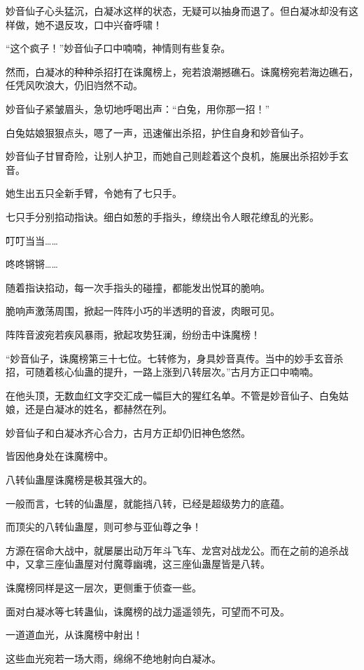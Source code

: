 \begin{this_body}
妙音仙子心头猛沉，白凝冰这样的状态，无疑可以抽身而退了。但白凝冰却没有这样做，她不退反攻，口中兴奋呼啸！

“这个疯子！”妙音仙子口中喃喃，神情则有些复杂。

然而，白凝冰的种种杀招打在诛魔榜上，宛若浪潮撼礁石。诛魔榜宛若海边礁石，任凭风吹浪大，仍旧岿然不动。

妙音仙子紧皱眉头，急切地呼喝出声：“白兔，用你那一招！”

白兔姑娘狠狠点头，嗯了一声，迅速催出杀招，护住自身和妙音仙子。

妙音仙子甘冒奇险，让别人护卫，而她自己则趁着这个良机，施展出杀招妙手玄音。

她生出五只全新手臂，令她有了七只手。

七只手分别掐动指诀。细白如葱的手指头，缭绕出令人眼花缭乱的光影。

叮叮当当……

咚咚锵锵……

随着指诀掐动，每一次手指头的碰撞，都能发出悦耳的脆响。

脆响声激荡周围，掀起一阵阵小巧的半透明的音波，肉眼可见。

阵阵音波宛若疾风暴雨，掀起攻势狂澜，纷纷击中诛魔榜！

“妙音仙子，诛魔榜第三十七位。七转修为，身具妙音真传。当中的妙手玄音杀招，可随着核心仙蛊的提升，一路上涨到八转层次。”古月方正口中喃喃。

在他头顶，无数血红文字交汇成一幅巨大的猩红名单。不管是妙音仙子、白兔姑娘，还是白凝冰的姓名，都赫然在列。

妙音仙子和白凝冰齐心合力，古月方正却仍旧神色悠然。

皆因他身处在诛魔榜中。

八转仙蛊屋诛魔榜是极其强大的。

一般而言，七转的仙蛊屋，就能挡八转，已经是超级势力的底蕴。

而顶尖的八转仙蛊屋，则可参与亚仙尊之争！

方源在宿命大战中，就屡屡出动万年斗飞车、龙宫对战龙公。而在之前的追杀战中，又拿三座仙蛊屋对付魔尊幽魂，这三座仙蛊屋皆是八转。

诛魔榜同样是这一层次，更侧重于侦查一些。

面对白凝冰等七转蛊仙，诛魔榜的战力遥遥领先，可望而不可及。

一道道血光，从诛魔榜中射出！

这些血光宛若一场大雨，绵绵不绝地射向白凝冰。


\end{this_body}
